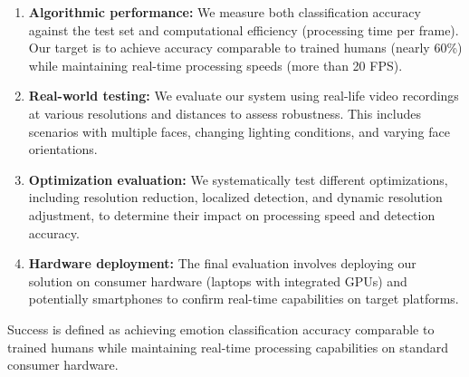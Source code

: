 \begin{enumerate}
    \item \textbf{Algorithmic performance:} We measure both classification accuracy against the test set and computational efficiency (processing time per frame). Our target is to achieve accuracy comparable to trained humans (nearly 60\%) while maintaining real-time processing speeds (more than 20 FPS).
    
    \item \textbf{Real-world testing:} We evaluate our system using real-life video recordings at various resolutions and distances to assess robustness. This includes scenarios with multiple faces, changing lighting conditions, and varying face orientations.
    
    \item \textbf{Optimization evaluation:} We systematically test different optimizations, including resolution reduction, localized detection, and dynamic resolution adjustment, to determine their impact on processing speed and detection accuracy.
    
    \item \textbf{Hardware deployment:} The final evaluation involves deploying our solution on consumer hardware (laptops with integrated GPUs) and potentially smartphones to confirm real-time capabilities on target platforms.
\end{enumerate}

Success is defined as achieving emotion classification accuracy comparable to trained humans while maintaining real-time processing capabilities on standard consumer hardware.

